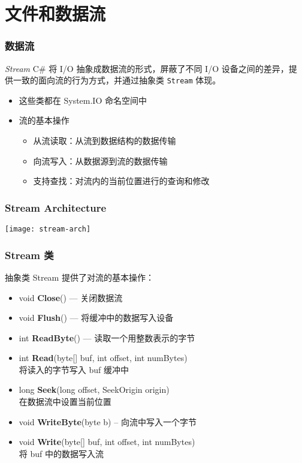 
\section{文件和数据流}

\begin{frame}
\frametitle{数据流}
\begin{block}{\textit{Stream}}
  \CJKindent C\# 将 I/O 抽象成数据流的形式，屏蔽了不同 I/O 设备之间的差异，提
  供一致的面向流的行为方式，并通过抽象类 \texttt{Stream} 体现。
\end{block}
\begin{itemize}
\item 这些类都在 System.IO 命名空间中
\item 流的基本操作
\begin{itemize}
\item 从流读取：从流到数据结构的数据传输
\item 向流写入：从数据源到流的数据传输
\item 支持查找：对流内的当前位置进行的查询和修改
\end{itemize}
\end{itemize}
\end{frame}

\begin{frame}
\frametitle{Stream Architecture}
\centering\texttt{[image: stream-arch]}
\end{frame}


\begin{frame}
\frametitle{Stream 类}

抽象类 Stream 提供了对流的基本操作：
\begin{itemize}
\item void \textbf{Close}() --- 关闭数据流
\item void \textbf{Flush}() --- 将缓冲中的数据写入设备
\item int \textbf{ReadByte}() --- 读取一个用整数表示的字节
\item int \textbf{Read}(byte[] buf, int offset, int numBytes) \\
  将读入的字节写入 buf 缓冲中
\item long \textbf{Seek}(long offset, SeekOrigin origin)  \\
  在数据流中设置当前位置
\item void \textbf{WriteByte}(byte b) -- 向流中写入一个字节
\item void \textbf{Write}(byte[] buf, int offset, int numBytes) \\
  将 buf 中的数据写入流
\end{itemize}
\end{frame}

